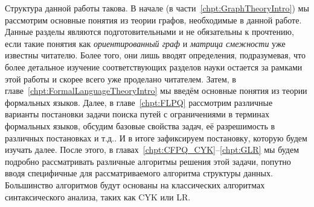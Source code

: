 Структура данной работы такова.
В начале (в части~\ref{chpt:GraphTheoryIntro}) мы рассмотрим основные понятия из теории графов, необходимые в данной работе. Данные разделы являются подготовительными и не обязательны к прочтению, если такие понятия как \textit{ориентированный граф} и \textit{матрица смежности} уже известны читателю. Более того, они лишь вводят определения, подразумевая, что более детальное изучение соответствующих разделов науки остается за рамками этой работы и скорее всего уже проделано читателем.
Затем, в главе~\ref{chpt:FormalLanguageTheoryIntro} мы введём основные понятия из теории формальных языков.
Далее, в главе~\ref{chpt:FLPQ} рассмотрим различные варианты постановки задачи поиска путей с ограничениями в терминах формальных языков, обсудим базовые свойства задач, её разрешимость в различных постановках и т.д..
И в итоге зафиксируем постановку, которую будем изучать далее.
После этого, в главах~\ref{chpt:CFPQ_CYK}--\ref{chpt:GLR} мы будем подробно рассматривать различные алгоритмы решения этой задачи, попутно вводя специфичные для рассматриваемого алгоритма структуры данных.
Большинство алгоритмов будут основаны на классических алгоритмах синтаксического анализа, таких как CYK или LR.


